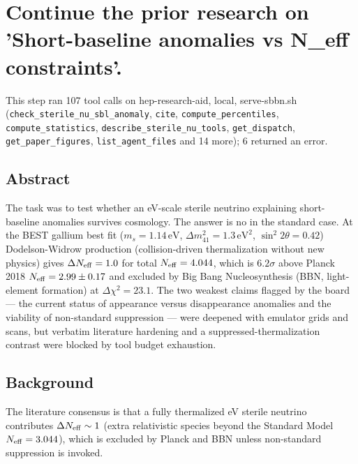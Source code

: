 \documentclass[11pt,a4paper]{article}
\begin{document}
\section{Continue the prior research on 'Short-baseline anomalies vs N\_eff constraints'.}
This step ran 107 tool calls on hep-research-aid, local, serve-sbbn.sh (\texttt{check\_sterile\_nu\_sbl\_anomaly}, \texttt{cite}, \texttt{compute\_percentiles}, \texttt{compute\_statistics}, \texttt{describe\_sterile\_nu\_tools}, \texttt{get\_dispatch}, \texttt{get\_paper\_figures}, \texttt{list\_agent\_files} and 14 more); 6 returned an error.\par
\subsection{Abstract}
The task was to test whether an eV-scale sterile neutrino explaining short-baseline anomalies survives cosmology. The answer is no in the standard case. At the BEST gallium best fit ($m_s = 1.14\,\mathrm{eV}$, $\Delta m^2_{41} = 1.3\,\mathrm{eV}^2$, $\sin^2 2\theta = 0.42$) Dodelson-Widrow production (collision-driven thermalization without new physics) gives $\Delta N_{\rm eff} = 1.0$ for total $N_{\rm eff} = 4.044$, which is $6.2\sigma$ above Planck 2018 $N_{\rm eff} = 2.99 \pm 0.17$ and excluded by Big Bang Nucleosynthesis (BBN, light-element formation) at $\Delta \chi^2 = 23.1$. The two weakest claims flagged by the board --- the current status of appearance versus disappearance anomalies and the viability of non-standard suppression --- were deepened with emulator grids and scans, but verbatim literature hardening and a suppressed-thermalization contrast were blocked by tool budget exhaustion.

\subsection{Background}
The literature consensus is that a fully thermalized eV sterile neutrino contributes $\Delta N_{\rm eff} \sim 1$ (extra relativistic species beyond the Standard Model $N_{\rm eff} = 3.044$), which is excluded by Planck and BBN unless non-standard suppression is invoked.
\end{document}
